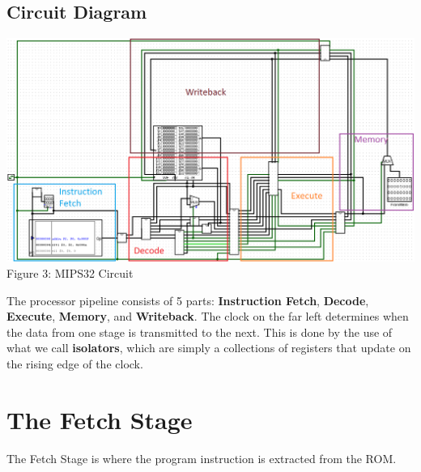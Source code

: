 \documentclass{article}
\begin{document}
\subsection{Circuit Diagram}
\begin{center}
\includegraphics[scale=0.4]{Overview.png} \\
Figure 3: MIPS32 Circuit
\end{center}
The processor pipeline consists of 5 parts: \textbf{Instruction Fetch}, \textbf{Decode}, \textbf{Execute}, \textbf{Memory}, and \textbf{Writeback}. The clock on the far left determines when the data from one stage is transmitted to the next. This is done by the use of what we call \textbf{isolators}, which are simply a collections of registers that update on the rising edge of the clock. 

\section{The Fetch Stage}
The Fetch Stage is where the program instruction is extracted from the ROM. 
\end{document}
